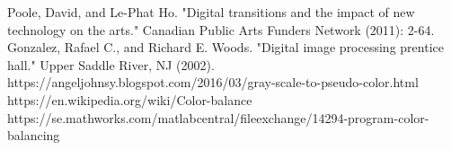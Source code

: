 \documentclass[conference]{IEEEtran}
\begin{document}
\begin{thebibliography}{00}
 Poole, David, and Le-Phat Ho. "Digital transitions and the impact of new technology on the arts." Canadian Public Arts Funders Network (2011): 2-64.
 Gonzalez, Rafael C., and Richard E. Woods. "Digital image processing prentice hall." Upper Saddle River, NJ (2002).
 https://angeljohnsy.blogspot.com/2016/03/gray-scale-to-pseudo-color.html
 https://en.wikipedia.org/wiki/Color-balance
 https://se.mathworks.com/matlabcentral/fileexchange/14294-program-color-balancing



\end{thebibliography}
\end{document}

